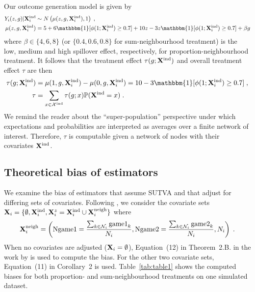 \documentclass[10pt]{article}
\begin{document}
Our outcome generation model is given by
\begin{align*}
Y_i(z,g)|\Xind_i &\sim N\left(\mu(z,g,\Xind_i),1\right) \;, \\
\mu(z,g,\Xind_i) &= 5 + 6\mathbbm{1}[\phi(1;\Xind_i)\geq 0.7] + 10z - 3z\mathbbm{1}[\phi(1;\Xind_i)\geq0.7] + \beta g
\end{align*}
where $\beta\in\{4,6,8\}$ (or $\{0.4,0.6,0.8\}$ for sum-neighbourhood treatment) is the low, medium and high spillover effect, respectively, for proportion-neighbourhood treatment. It follows that the treatment effect $\tau(g;
\mathbf{X}^{\text{ind}})$ and overall treatment effect $\tau$ are then
\begin{align*}
\tau(g;\Xind_i) &= \mu(1,g,\Xind_i) - \mu(0,g,\Xind_i) = 10 - 3\mathbbm{1}[\phi(1;\Xind_i)\geq0.7] \;, \\
\tau &= \sum_{x\in\calX^\text{ind}}\tau(g;x)\P(\Xind=x) \;.
\end{align*}
We remind the reader about the ``super-population'' perspective \parencite{Imbens:2015} under which expectations and probabilities are interpreted as averages over a finite network of interest. Therefore, $\tau$ is computable given a network of nodes with their covariates $\mathbf{X}^{\text{ind}}$.

\subsection{Theoretical bias of estimators}

We examine the bias of estimators that assume SUTVA and that adjust for differing sets of covariates. Following \textcite{Forastiere:2021}, we consider the covariate sets $\mathbf{X}_i=\{\emptyset,\mathbf{X}^{\text{ind}}_i,\mathbf{X}_i^z=\mathbf{X}^{\text{ind}}_i\cup\mathbf{X}^{\text{neigh}}_i\}$ where
\[
\mathbf{X}^{\text{neigh}}_i=\left(\text{Ngame1}=\frac{\sum_{k\in\mathcal{N}_i}\text{game1}_k}{N_i},\text{Ngame2}=\frac{\sum_{k\in\mathcal{N}_i}\text{game2}_k}{N_i},N_i\right) \;.
\]
When no covariates are adjusted ($\mathbf{X}_i=\emptyset$), Equation~(12) in Theorem~2.B. in the work by \textcite{Forastiere:2021} is used to compute the bias. For the other two covariate sets, Equation~(11) in Corollary~2 is used. Table~\ref{tab:table1} shows the computed biases for both proportion- and sum-neighbourhood treatments on one simulated dataset.
\\
\end{document}
